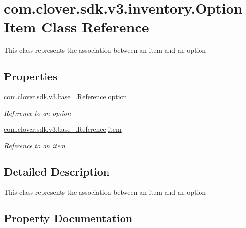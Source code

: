 \hypertarget{classcom_1_1clover_1_1sdk_1_1v3_1_1inventory_1_1_option_item}{}\section{com.\+clover.\+sdk.\+v3.\+inventory.\+Option\+Item Class Reference}
\label{classcom_1_1clover_1_1sdk_1_1v3_1_1inventory_1_1_option_item}


This class represents the association between an item and an option  


\subsection*{Properties}
\begin{DoxyCompactItemize}
\item 
\hyperlink{classcom_1_1clover_1_1sdk_1_1v3_1_1base___1_1_reference}{com.\+clover.\+sdk.\+v3.\+base\+\_\+.\+Reference} \hyperlink{classcom_1_1clover_1_1sdk_1_1v3_1_1inventory_1_1_option_item_ab9113ba4bd277f3e8735999fab21c6ca}{option}
\begin{DoxyCompactList}\small\item\em Reference to an option \end{DoxyCompactList}\item 
\hyperlink{classcom_1_1clover_1_1sdk_1_1v3_1_1base___1_1_reference}{com.\+clover.\+sdk.\+v3.\+base\+\_\+.\+Reference} \hyperlink{classcom_1_1clover_1_1sdk_1_1v3_1_1inventory_1_1_option_item_abf28f5c0ed9815e1a81cb41b67ff1167}{item}
\begin{DoxyCompactList}\small\item\em Reference to an item \end{DoxyCompactList}\end{DoxyCompactItemize}


\subsection{Detailed Description}
This class represents the association between an item and an option 



\subsection{Property Documentation}
\mbox{\label{classcom_1_1clover_1_1sdk_1_1v3_1_1inventory_1_1_option_item_abf28f5c0ed9815e1a81cb41b67ff1167}} 
